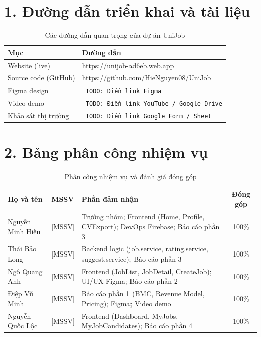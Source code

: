 
\section*{1. Đường dẫn triển khai và tài liệu}

\begin{table}[H]
\centering
\caption{Các đường dẫn quan trọng của dự án UniJob}
\renewcommand{\arraystretch}{1.5}
\begin{tabularx}{\textwidth}{|p{4cm}|X|}
\hline
Mục & Đường dẫn \\
\hline
Website (live)          & \url{https://unijob-ad6eb.web.app} \\
\hline
Source code (GitHub)    & \url{https://github.com/HieNguyen08/UniJob} \\
\hline
Figma design            & \texttt{ TODO: Điền link Figma} \\
\hline
Video demo              & \texttt{ TODO: Điền link YouTube / Google Drive} \\
\hline
Khảo sát thị trường     & \texttt{ TODO: Điền link Google Form / Sheet} \\
\hline
\end{tabularx}
\end{table}

\section*{2. Bảng phân công nhiệm vụ}

\begin{table}[H]
\centering
\caption{Phân công nhiệm vụ và đánh giá đóng góp}
\renewcommand{\arraystretch}{1.6}
\begin{tabularx}{\textwidth}{|p{3.2cm}|p{1.8cm}|X|c|}
\hline
Họ và tên & MSSV & Phần đảm nhận & Đóng góp \\
\hline
Nguyễn Minh Hiếu  & {[MSSV]} & Trưởng nhóm; Frontend (Home, Profile, CVExport); DevOps Firebase; Báo cáo phần 3 & 100\% \\
\hline
Thái Bảo Long     & {[MSSV]} & Backend logic (job.service, rating.service, suggest.service); Báo cáo phần 3 & 100\% \\
\hline
Ngô Quang Anh     & {[MSSV]} & Frontend (JobList, JobDetail, CreateJob); UI/UX Figma; Báo cáo phần 2 & 100\% \\
\hline
Điệp Vũ Minh      & {[MSSV]} & Báo cáo phần 1 (BMC, Revenue Model, Pricing); Figma; Video demo & 100\% \\
\hline
Nguyễn Quốc Lộc   & {[MSSV]} & Frontend (Dashboard, MyJobs, MyJobCandidates); Báo cáo phần 4 & 100\% \\
\hline
\end{tabularx}
\end{table}
